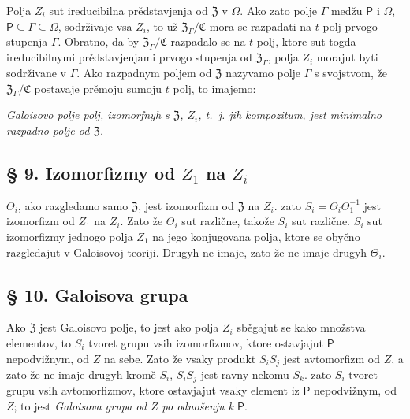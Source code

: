 \documentclass[11pt]{article}
\begin{document}
Polja \(Z_i\) sut ireducibilna prědstavjenja od \(\mathfrak Z\) v \(\Omega\). Ako zato polje \(\Gamma\) medžu \(\mathsf P\) i \(\Omega\), \(\mathsf P\subseteq\Gamma\subseteq\Omega\), sodrživaje vsa \(Z_i\), to už \(\mathfrak Z_\Gamma/\mathfrak C\) mora se razpadati na \(t\) polj prvogo stupenja \(\Gamma\). Obratno, da by \(\mathfrak Z_\Gamma/\mathfrak C\) razpadalo se na \(t\) polj, ktore sut togda ireducibilnymi prědstavjenjami prvogo stupenja od \(\mathfrak Z_\Gamma\), polja \(Z_i\) morajut byti sodrživane v \(\Gamma\). Ako razpadnym poljem od \(\mathfrak Z\) nazyvamo polje \(\Gamma\) s svojstvom, že \(\mathfrak Z_\Gamma/\mathfrak C\) postavaje prěmoju sumoju \(t\) polj, to imajemo:

\emph{Galoisovo polje polj, izomorfnyh s \(\mathfrak Z\), \(Z_i\), t.~j. jih kompozitum, jest minimalno razpadno polje od \(\mathfrak Z\).}

\subsection*{§ 9. Izomorfizmy od \(Z_1\) na \(Z_i\)}\label{die-isomorphismen-von-z1-auf-die-zi}

\(\Theta_i\), ako razgledamo samo \(\mathfrak Z\), jest izomorfizm od \(\mathfrak Z\) na \(Z_i\). zato \(S_i=\Theta_i\Theta_1^{-1}\) jest izomorfizm od \(Z_1\) na \(Z_i\). Zato že \(\Theta_i\) sut različne, takože \(S_i\) sut različne. \(S_i\) sut izomorfizmy jednogo polja \(Z_1\) na jego konjugovana polja, ktore se obyčno razgledajut v Galoisovoj teoriji. Drugyh ne imaje, zato že ne imaje drugyh \(\Theta_i\).

\subsection*{§ 10. Galoisova grupa}\label{die-galoissche-gruppe}

Ako \(\mathfrak Z\) jest Galoisovo polje, to jest ako polja \(Z_i\) sběgajut se kako množstva elementov, to \(S_i\) tvoret grupu vsih izomorfizmov, ktore ostavjajut \(\mathsf P\) nepodvižnym, od \(Z\) na sebe. Zato že vsaky produkt \(S_iS_j\) jest avtomorfizm od \(Z\), a zato že ne imaje drugyh kromě \(S_i\), \(S_iS_j\) jest ravny nekomu \(S_k\). zato \(S_i\) tvoret grupu vsih avtomorfizmov, ktore ostavjajut vsaky element iz \(\mathsf P\) nepodvižnym, od \(Z\); to jest \emph{Galoisova grupa od \(Z\) po odnošenju k \(\mathsf P\)}.

\end{document}
